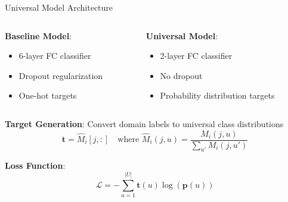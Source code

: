 \documentclass[aspectratio=169]{beamer}
\begin{document}
\begin{frame}{Universal Model Architecture}
    \begin{columns}[T]
        \begin{column}{0.48\textwidth}
            \textbf{Baseline Model}:
            \begin{itemize}
                \item 6-layer FC classifier
                \item Dropout regularization
                \item One-hot targets
            \end{itemize}
        \end{column}

        \begin{column}{0.48\textwidth}
            \textbf{Universal Model}:
            \begin{itemize}
                \item 2-layer FC classifier
                \item No dropout
                \item Probability distribution targets
            \end{itemize}
        \end{column}
    \end{columns}

    \vspace{1em}

    \textbf{Target Generation}: Convert domain labels to universal class distributions
    \begin{equation}
        \mathbf{t} = \hat{M}_i[j, :] \quad \text{where } \hat{M}_i(j, u) = \frac{M_i(j, u)}{\sum_{u'} M_i(j, u')}
    \end{equation}

    \textbf{Loss Function}:
    \begin{equation}
        \mathcal{L} = -\sum_{u=1}^{|U|} \mathbf{t}(u) \log(\mathbf{p}(u))
    \end{equation}
\end{frame}
\end{document}
